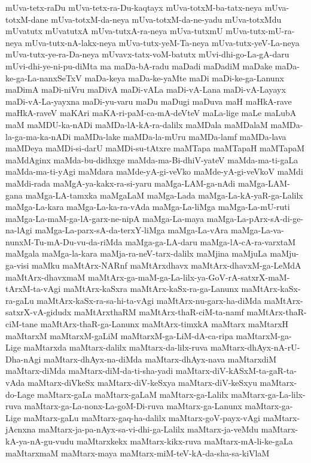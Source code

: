 {mUva-tetx-raDu
mUva-tetx-ra-Du-kaqtayx
mUva-totxM-ba-tatx-neya
mUva-totxM-dane
mUva-totxM-da-neya
mUva-totxM-da-ne-yadu
mUva-totxMdu
mUvatutx
mUvatutxA
mUva-tutxA-ra-neya
mUva-tutxmU
mUva-tutx-mU-ra-neya
mUva-tutx-nA-lakx-neya
mUva-tutx-yeM-Ta-neya
mUva-tutx-yeV-La-neya
mUva-tutx-ye-ra-Da-neya
mUvavx-tatx-voM-batutx
mUvi-dhi-go-La-gA-daru
mUvi-dhi-ye-ni-pu-diMta
ma
maDa-bA-radu
maDadi
maDadiM
maDake
maDa-ke-ga-La-nanxSeTxV
maDa-keya
maDa-ke-yaMte
maDi
maDi-ke-ga-Lanunx
maDimA
maDi-niVru
maDivA
maDi-vALa
maDi-vA-Lana
maDi-vA-Layayx
maDi-vA-La-yayxna
maDi-yu-varu
maDu
maDugi
maDuva
maH
maHkA-rave
maHkA-raveV
maKAri
maKA-ri-paM-ca-mA-deVteV
maLa-lige
maLe
maLubA
maM
maMDU-ka-nADi
maMDa-lA-kA-ra-dalilx
maMDala
maMDalaM
maMDa-la-ga-ma-ka-nADi
maMDa-lake
maMDa-la-mUru
maMDa-lamf
maMDa-lava
maMDeya
maMDi-si-darU
maMDi-su-tAtxre
maMTapa
maMTapaH
maMTapaM
maMdAginx
maMda-bu-didhxge
maMda-ma-Bi-dhiV-yateV
maMda-ma-ti-gaLa
maMda-ma-ti-yAgi
maMdara
maMde-yA-gi-veVko
maMde-yA-gi-veVkoV
maMdi
maMdi-rada
maMgA-ya-kakx-ra-si-yaru
maMga-LAM-ga-nAdi
maMga-LAM-gana
maMga-LA-tamxka
maMgaLaM
maMga-Lada
maMga-La-kA-yaR-ga-Lalilx
maMga-La-kara
maMga-La-ka-ra-vAda
maMga-La-liMga
maMga-La-mU-ruti
maMga-La-maM-ga-lA-garx-ne-nipA
maMga-La-maya
maMga-La-pArx-sA-di-ge-na-lAgi
maMga-La-parx-sA-da-terxY-liMga
maMga-La-vAra
maMga-La-va-nunxM-Tu-mA-Du-vu-da-riMda
maMga-ga-LA-daru
maMga-lA-cA-ra-varxtaM
maMgala
maMga-la-kara
maMja-ra-neV-tarx-dalilx
maMjina
maMjuLa
maMju-ga-visi
maMku
maMtArx-NARnf
maMtArxdhavx
maMtArx-dhavxM-ga-LeMdA
maMtArx-dhavxmaM
maMtArx-ga-maM-ga-La-lilx-ya-GoV-rA-satxrX-maM-tArxM-ta-vAgi
maMtArx-kaSxra
maMtArx-kaSx-ra-ga-Lanunx
maMtArx-kaSx-ra-gaLu
maMtArx-kaSx-ra-sa-hi-ta-vAgi
maMtArx-nu-garx-ha-diMda
maMtArx-satxrX-vA-gidudx
maMtArxthaRM
maMtArx-thaR-ciM-ta-namf
maMtArx-thaR-ciM-tane
maMtArx-thaR-ga-Lanunx
maMtArx-timxkA
maMtarx
maMtarxH
maMtarxM
maMtarxM-gaLiM
maMtarxM-ga-LiM-dA-ca-ripa
maMtarxM-ga-Lige
maMtarxda
maMtarx-dalilx
maMtarx-da-lilx-ruva
maMtarx-dhAyx-nA-rU-Dha-nAgi
maMtarx-dhAyx-na-diMda
maMtarx-dhAyx-nava
maMtarxdiM
maMtarx-diMda
maMtarx-diM-da-ti-sha-yadi
maMtarx-diV-kASxM-ta-gaR-ta-vAda
maMtarx-diVkeSx
maMtarx-diV-keSxya
maMtarx-diV-keSxyu
maMtarx-do-Lage
maMtarx-gaLa
maMtarx-gaLaM
maMtarx-ga-Lalilx
maMtarx-ga-La-lilx-ruva
maMtarx-ga-La-nonx-La-goM-Di-ruva
maMtarx-ga-Lanunx
maMtarx-ga-Lige
maMtarx-gaLu
maMtarx-gaq-ha-dalilx
maMtarx-goV-payx-vAgi
maMtarx-jAcnxna
maMtarx-ja-pa-nAyx-sa-vi-dhi-ga-Lalilx
maMtarx-ja-veMdu
maMtarx-kA-ya-nA-gu-vudu
maMtarxkekx
maMtarx-kikx-ruva
maMtarx-mA-li-ke-gaLa
maMtarxmaM
maMtarx-maya
maMtarx-miM-teV-kA-da-sha-sa-kiVlaM
}
